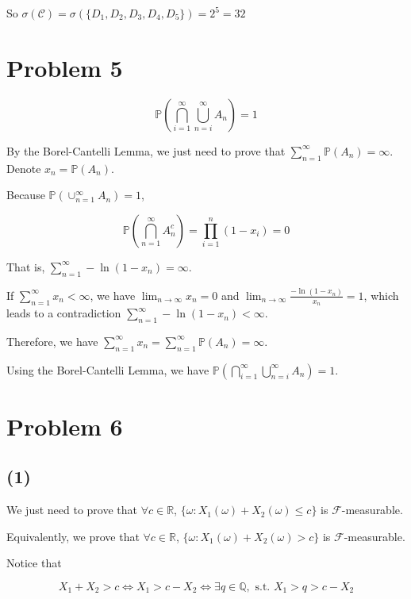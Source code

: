 \documentclass{article}
\begin{document}
So $\sigma(\mathcal{C}) = \sigma(\{D_1,D_2,D_3,D_4,D_5\}) = 2^5 = 32$

\section{Problem 5}

\begin{equation}
    \mathbb{P}\left(\bigcap_{i=1}^{\infty} \bigcup_{n=i}^{\infty} A_{n}\right) = 1
\end{equation}

By the Borel-Cantelli Lemma, we just need to prove that $\sum_{n=1}^{\infty} \mathbb{P}(A_n)= \infty$. Denote $x_n = \mathbb{P}(A_n)$. 

Because $\mathbb{P}\left(\cup_{n=1}^{\infty} A_{n}\right) = 1$, 

\begin{equation}
    \mathbb{P}\left(\bigcap_{n=1}^{\infty} A_{n}^c\right) = \prod_{i=1}^n (1-x_i) = 0
\end{equation}

That is, $\sum_{n=1}^{\infty} -\ln(1-x_n) = \infty$. 

If $\sum_{n=1}^{\infty} x_n < \infty$, we have $\lim_{n\to \infty} x_n = 0$ and $\lim_{n \to \infty} \frac {-\ln(1-x_n)}{x_n} = 1$, which leads to a contradiction $\sum_{n=1}^{\infty} -\ln(1-x_n) < \infty$. 

Therefore, we have $\sum_{n=1}^{\infty} x_n = \sum_{n=1}^{\infty} \mathbb{P}(A_n) = \infty$. 

Using the Borel-Cantelli Lemma, we have $\mathbb{P}\left(\bigcap_{i=1}^{\infty} \bigcup_{n=i}^{\infty} A_{n}\right)=1$.

\section{Problem 6}

\subsection{(1)}

We just need to prove that $\forall c \in \mathbb{R}$, $\{\omega: X_1(\omega) +X_2(\omega) \leqslant c\}$ is $\mathcal{F}$-measurable. 

Equivalently, we prove that $\forall c \in \mathbb{R}$, $\{\omega: X_1(\omega) +X_2(\omega) > c\}$ is $\mathcal{F}$-measurable.

Notice that 

\begin{equation}
    X_1+X_2 > c \Longleftrightarrow X_1 > c - X_2 \Longleftrightarrow \exists q \in \mathbb{Q},\text{ s.t. } X_1 > q > c - X_2
\end{equation}
\end{document}
